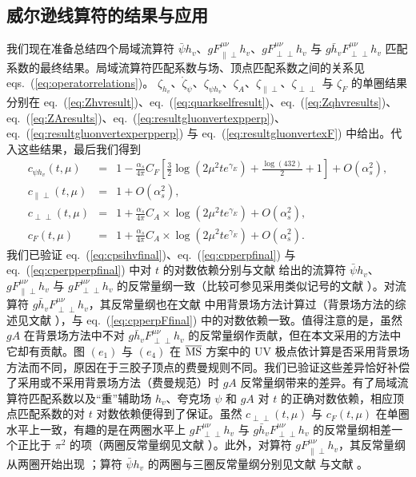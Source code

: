 \subsection{威尔逊线算符的结果与应用}
我们现在准备总结四个局域流算符 $\bar{\psi} h_v$、$gF^{\mu\nu}_{\|\perp}h_v$、$gF^{\mu\nu}_{\perp\perp}h_v$ 与 $g\bar{h}_vF^{\mu\nu}_{\perp\perp}h_v$ 匹配系数的最终结果。局域流算符匹配系数与场、顶点匹配系数之间的关系见 eqs.~(\ref{eq:operatorrelations})。
$\zeta_{h_v}$、$\mathring{\zeta}_{\psi}$、$\zeta_{\psi h_v}$、$\zeta_{A}$、$\zeta_{\|\perp}$、$\zeta_{\perp\perp}$ 与 $\zeta_F$ 的单圈结果分别在 eq.~(\ref{eq:Zhvresult})、eq.~(\ref{eq:quarkselfresult})、eq.~(\ref{eq:Zqhvresults})、eq.~(\ref{eq:ZAresults})、eq.~(\ref{eq:resultgluonvertexpperp})、eq.~(\ref{eq:resultgluonvertexperpperp}) 与 eq.~(\ref{eq:resultgluonvertexF}) 中给出。代入这些结果，最后我们得到
\begin{eqnarray}
\label{eq:cpsihvfinal}
c_{\psi h_v}(t, \mu) &=& 1- \frac{\alpha_s}{4\pi}C_F\left[\frac{3}{2}\log\left(2\mu^2 te^{\gamma_E}\right)+\frac{\log(432)}{2}+1\right] +O(\alpha_s^2),\\
\label{eq:cpperpfinal}
c_{\|\perp} (t, \mu) &=& 1+O(\alpha_s^2),\\
\label{eq:cperpperpfinal}
c_{\perp\perp} (t, \mu) &=&1+ \frac{\alpha_s}{4\pi}C_A\times\log\left(2\mu^2 te^{\gamma_E}\right) +O(\alpha_s^2),\\
\label{eq:cpperpFfinal}
c_F(t, \mu)  &=& 1+\frac{\alpha_s}{4\pi}C_A\times\log\left(2\mu^2 te^{\gamma_E}\right) +O(\alpha_s^2).
\end{eqnarray}
我们已验证 eq.~(\ref{eq:cpsihvfinal})、eq.~(\ref{eq:cpperpfinal}) 与 eq.~(\ref{eq:cperpperpfinal}) 中对 $t$ 的对数依赖分别与文献 \cite{Dorn:1980hs,Dorn:1981wa,Dorn:1986dt} 给出的流算符 $\bar{\psi} h_v$、$gF^{\mu\nu}_{\|\perp}h_v$ 与 $gF^{\mu\nu}_{\perp\perp}h_v$ 的反常量纲一致（比较可参见采用类似记号的文献 \cite{Braun:2020ymy}）。对流算符 $g\bar{h}_vF^{\mu\nu}_{\perp\perp}h_v$，其反常量纲也在文献 \cite{Eichten:1990vp,Falk:1990pz} 中用背景场方法计算过（背景场方法的综述见文献 \cite{Abbott:1981ke}），与 eq.~(\ref{eq:cpperpFfinal}) 中的对数依赖一致。值得注意的是，虽然 $gA$ 在背景场方法中不对 $g\bar{h}_vF^{\mu\nu}_{\perp\perp}h_v$ 的反常量纲作贡献，但在本文采用的方法中它却有贡献。图 $(e_1)$ 与 $(e_4)$ 在 $\overline{\rm MS}$ 方案中的 UV 极点依计算是否采用背景场方法而不同，原因在于三胶子顶点的费曼规则不同。我们已验证这些差异恰好补偿了采用或不采用背景场方法（费曼规范）时 $gA$ 反常量纲带来的差异。有了局域流算符匹配系数以及``重''辅助场 $h_v$、夸克场 $\psi$ 和 $gA$ 对 $t$ 的正确对数依赖，相应顶点匹配系数的对 $t$ 对数依赖便得到了保证。虽然 $c_{\perp\perp}(t, \mu)$ 与 $c_F(t, \mu)$ 在单圈水平上一致，有趣的是在两圈水平上 $gF^{\mu\nu}_{\perp\perp}h_v$ 与 $g\bar{h}_vF^{\mu\nu}_{\perp\perp}h_v$ 的反常量纲相差一个正比于 $\pi^2$ 的项（两圈反常量纲见文献 \cite{Braun:2020ymy, Amoros:1997rx,Czarnecki:1997dz}）。此外，对算符 $gF^{\mu\nu}_{\|\perp}h_v$，其反常量纲从两圈开始出现 \cite{Braun:2020ymy}；算符 $\bar{\psi} h_v$ 的两圈与三圈反常量纲分别见文献 \cite{Broadhurst:1991fz,Ji:1991pr} 与文献 \cite{Chetyrkin:2003vi}。

